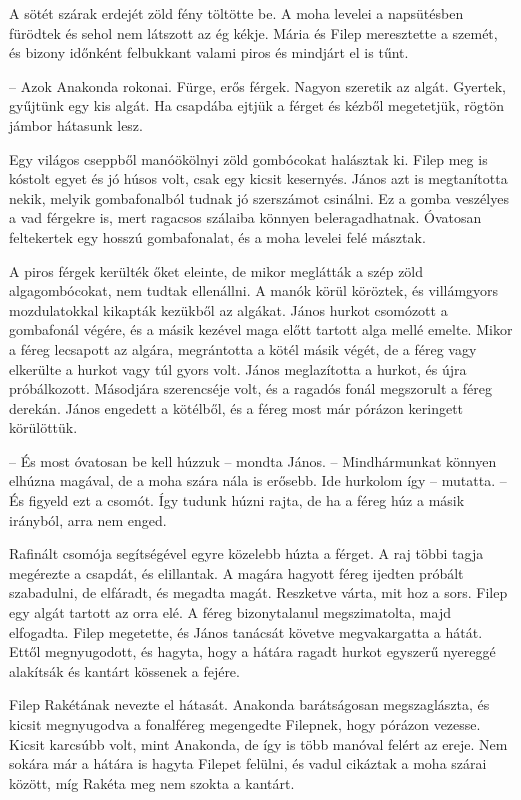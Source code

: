 \documentclass[10pt]{memoir}
\begin{document}
A sötét szárak erdejét zöld fény töltötte be. A moha levelei a napsütésben
fürödtek és sehol nem látszott az ég kékje. Mária és Filep meresztette a
szemét, és bizony időnként felbukkant valami piros és mindjárt el is tűnt.

-- Azok Anakonda rokonai. Fürge, erős férgek. Nagyon szeretik az algát.
Gyertek, gyűjtünk egy kis algát. Ha csapdába ejtjük a férget és kézből
megetetjük, rögtön jámbor hátasunk lesz.

Egy világos cseppből manóökölnyi zöld gombócokat halásztak ki. Filep meg is
kóstolt egyet és jó húsos volt, csak egy kicsit kesernyés. János azt is
megtanította nekik, melyik gombafonalból tudnak jó szerszámot csinálni. Ez a
gomba veszélyes a vad férgekre is, mert ragacsos szálaiba könnyen
beleragadhatnak. Óvatosan feltekertek egy hosszú gombafonalat, és a moha
levelei felé másztak.

A piros férgek kerülték őket eleinte, de mikor meglátták a szép zöld
algagombócokat, nem tudtak ellenállni. A manók körül köröztek, és villámgyors
mozdulatokkal kikapták kezükből az algákat. János hurkot csomózott a gombafonál
végére, és a másik kezével maga előtt tartott alga mellé emelte. Mikor a féreg
lecsapott az algára, megrántotta a kötél másik végét, de a féreg vagy elkerülte
a hurkot vagy túl gyors volt. János meglazította a hurkot, és újra
próbálkozott. Másodjára szerencséje volt, és a ragadós fonál megszorult a féreg
derekán. János engedett a kötélből, és a féreg most már pórázon keringett
körülöttük.

-- És most óvatosan be kell húzzuk -- mondta János. -- Mindhármunkat könnyen
elhúzna magával, de a moha szára nála is erősebb. Ide hurkolom így -- mutatta.
-- És figyeld ezt a csomót. Így tudunk húzni rajta, de ha a féreg húz a másik
irányból, arra nem enged.

Rafinált csomója segítségével egyre közelebb húzta a férget. A raj többi tagja
megérezte a csapdát, és elillantak. A magára hagyott féreg ijedten próbált
szabadulni, de elfáradt, és megadta magát. Reszketve várta, mit hoz a sors.
Filep egy algát tartott az orra elé. A féreg bizonytalanul megszimatolta, majd
elfogadta. Filep megetette, és János tanácsát követve megvakargatta a hátát.
Ettől megnyugodott, és hagyta, hogy a hátára ragadt hurkot egyszerű nyereggé
alakítsák és kantárt kössenek a fejére.

Filep Rakétának nevezte el hátasát. Anakonda barátságosan megszaglászta, és
kicsit megnyugodva a fonalféreg megengedte Filepnek, hogy pórázon vezesse.
Kicsit karcsúbb volt, mint Anakonda, de így is több manóval felért az ereje.
Nem sokára már a hátára is hagyta Filepet felülni, és vadul cikáztak a moha
szárai között, míg Rakéta meg nem szokta a kantárt.
\end{document}
